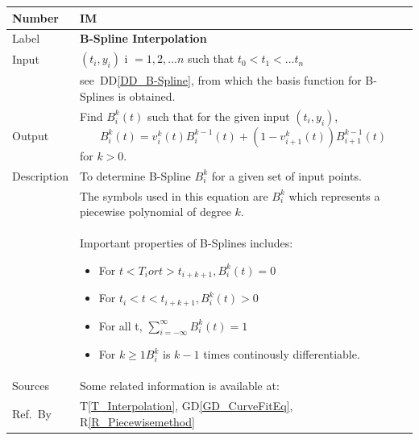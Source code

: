 \documentclass[12pt]{article}
\newcommand{\colAwidth}{0.13\textwidth}
\newcommand{\colBwidth}{0.82\textwidth}
\newcommand{\dref}[1]{GD\ref{#1}}
\newcommand{\ddref}[1]{DD\ref{#1}}
\newcommand{\tref}[1]{T\ref{#1}}
\newcounter{instnum} %
\newcommand{\rref}[1]{R\ref{#1}}
\begin{document}
\begin{minipage}{\textwidth}
	\renewcommand*{\arraystretch}{1.5}
	\begin{tabular}{| p{\colAwidth} | p{\colBwidth}|}
		\hline
		\rowcolor[gray]{0.9}
		Number
		& IM{instnum}\theinstnum \label{IM_BSpline}\\
		\hline
		
		Label
		& \bf B-Spline Interpolation\\
		\hline
		
		Input
		& $(t_i,y_i)$ i $= {1,2,...n}$ such that $t_0 < t_1 < ...t_n$ \\
		& see~\ddref{DD_B-Spline}, from which the basis function for B-Splines is obtained.\\
		\hline
		
		Output
		&Find $B^{k} _{i}(t)$ such that for the given input $(t_i,y_i)$,
		\begin{equation*}
		B_i ^k (t) = v_i ^k (t) B_i ^{k-1} (t) + (1 - v_{i+1} ^k (t))B_{i+1} ^{k-1} (t)
		\end{equation*} 
		for $k>0$.\\
		\hline
		
		Description & To determine B-Spline $B_i ^k$ for a given set of input points.\\
		& The symbols used in this equation are $B_i ^k$ which represents a piecewise polynomial of degree $k$.\\
		& Important properties of B-Splines includes:
		\begin{itemize}
			\item For $t < T_i or t > t_{i+k+1}, B ^{k} _i (t) = 0$
			\item For $t_i < t < t_{i+k+1}, B ^{k} _i (t) > 0$
			\item For all t, $\sum_{i= - \infty}^{\infty} B ^{k} _i (t) = 1 $
			\item For $k \geq 1 B ^{k} _i$ is $k-1$ times continously differentiable. 
		\end{itemize}\\
		\hline
		
		Sources& Some related information is available at:~\cite{Health1997}\\
		\hline
		
		Ref.\ By & \tref{T_Interpolation}, \dref{GD_CurveFitEq}, \rref{R_Piecewisemethod}\\
		\hline
	\end{tabular}
\end{minipage}\\
\end{document}
